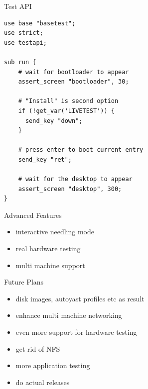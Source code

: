 \documentclass[
]{beamer}
\begin{document}

\begin{frame}[fragile]{Test API}
  \lstset{style=myperl}
  \begin{lstlisting}
use base "basetest";
use strict;
use testapi;

sub run {
    # wait for bootloader to appear
    assert_screen "bootloader", 30;

    # "Install" is second option
    if (!get_var('LIVETEST')) {
      send_key "down";
    }

    # press enter to boot current entry
    send_key "ret";

    # wait for the desktop to appear
    assert_screen "desktop", 300;
}
  \end{lstlisting}
\end{frame}

\begin{frame}{Advanced Features}
  \begin{itemize}
    \item interactive needling mode
    \item real hardware testing
    \item multi machine support
  \end{itemize}
\end{frame}

\begin{frame}{Future Plans}
  \begin{itemize}
    \item disk images, autoyast profiles etc as result
    \item enhance multi machine networking
    \item even more support for hardware testing
    \item get rid of NFS
    \item more application testing
    \item do actual releases
  \end{itemize}
\end{frame}
\end{document}
